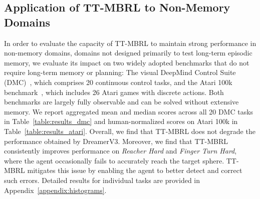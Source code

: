 

\subsection{Application of TT-MBRL to Non-Memory Domains}

In order to evaluate the capacity of TT-MBRL to maintain strong performance in non-memory domains, domains not designed primarily to test long-term episodic memory, we evaluate its impact on two widely adopted benchmarks that do not require long-term memory or planning: The visual DeepMind Control Suite (DMC)~\citep{tassa2018deepmind}, which comprises 20 continuous control tasks, and the Atari 100k benchmark~\citep{kaiser2019model}, which includes 26 Atari games with discrete actions. Both benchmarks are largely fully observable and can be solved without extensive memory. We report aggregated mean and median scores across all 20 DMC tasks in Table~\ref{table:results_dmc} and human-normalized scores on Atari 100k in Table~\ref{table:results_atari}. Overall, we find that TT-MBRL does not degrade the performance obtained by DreamerV3. Moreover, we find that TT-MBRL consistently improves performance on \textit{Reacher Hard} and \textit{Finger Turn Hard}, where the agent occasionally fails to accurately reach the target sphere. TT-MBRL mitigates this issue by enabling the agent to better detect and correct such errors. Detailed results for individual tasks are provided in Appendix~\ref{appendix:histograms}.
